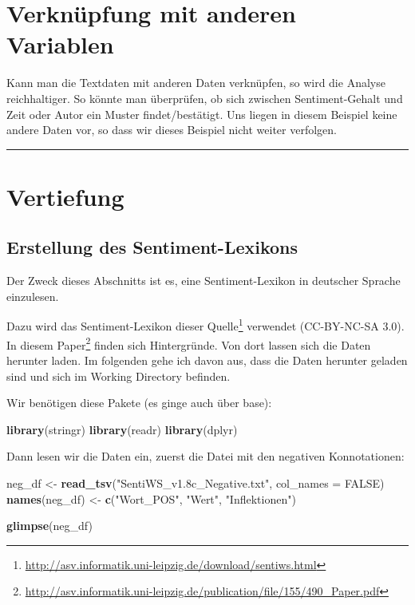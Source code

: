 \documentclass[12pt,]{book}
\makeatletter
\newenvironment{Shaded}{\begin{snugshade}}{\end{snugshade}}
\newcommand{\KeywordTok}[1]{\textcolor[rgb]{0.13,0.29,0.53}{\textbf{{#1}}}}
\newcommand{\DataTypeTok}[1]{\textcolor[rgb]{0.13,0.29,0.53}{{#1}}}
\newcommand{\StringTok}[1]{\textcolor[rgb]{0.31,0.60,0.02}{{#1}}}
\newcommand{\OtherTok}[1]{\textcolor[rgb]{0.56,0.35,0.01}{{#1}}}
\newcommand{\NormalTok}[1]{{#1}}
\renewcommand{\href}[2]{#2\footnote{\url{#1}}}
\newenvironment{kframe}{%
\medskip{}
\setlength{\fboxsep}{.8em}
 \def\at@end@of@kframe{}%
 \ifinner\ifhmode%
  \def\at@end@of@kframe{\end{minipage}}%
  \begin{minipage}{\columnwidth}%
 \fi\fi%
 \def\FrameCommand##1{\hskip\@totalleftmargin \hskip-\fboxsep
 \colorbox{shadecolor}{##1}\hskip-\fboxsep
     \hskip-\linewidth \hskip-\@totalleftmargin \hskip\columnwidth}%
 \MakeFramed {\advance\hsize-\width
   \@totalleftmargin\z@ \linewidth\hsize
   \@setminipage}}%
 {\par\unskip\endMakeFramed%
 \at@end@of@kframe}
\renewenvironment{Shaded}{\begin{kframe}}{\end{kframe}}
\makeatother
\begin{document}
\section{Verknüpfung mit anderen
Variablen}\label{verknupfung-mit-anderen-variablen}

Kann man die Textdaten mit anderen Daten verknüpfen, so wird die Analyse
reichhaltiger. So könnte man überprüfen, ob sich zwischen
Sentiment-Gehalt und Zeit oder Autor ein Muster findet/bestätigt. Uns
liegen in diesem Beispiel keine andere Daten vor, so dass wir dieses
Beispiel nicht weiter verfolgen.

\begin{center}\rule{0.5\linewidth}{\linethickness}\end{center}

\section{Vertiefung}\label{vertiefung}

\subsection{Erstellung des
Sentiment-Lexikons}\label{erstellung-des-sentiment-lexikons}

Der Zweck dieses Abschnitts ist es, eine Sentiment-Lexikon in deutscher
Sprache einzulesen.

Dazu wird das Sentiment-Lexikon
\href{http://asv.informatik.uni-leipzig.de/download/sentiws.html}{dieser
Quelle} verwendet (CC-BY-NC-SA 3.0). In
\href{http://asv.informatik.uni-leipzig.de/publication/file/155/490_Paper.pdf}{diesem
Paper} finden sich Hintergründe. Von dort lassen sich die Daten herunter
laden. Im folgenden gehe ich davon aus, dass die Daten herunter geladen
sind und sich im Working Directory befinden.

Wir benötigen diese Pakete (es ginge auch über base):

\begin{Shaded}
\begin{Highlighting}[]
\KeywordTok{library}\NormalTok{(stringr)}
\KeywordTok{library}\NormalTok{(readr)}
\KeywordTok{library}\NormalTok{(dplyr)}
\end{Highlighting}
\end{Shaded}

Dann lesen wir die Daten ein, zuerst die Datei mit den negativen
Konnotationen:

\begin{Shaded}
\begin{Highlighting}[]
\NormalTok{neg_df <-}\StringTok{ }\KeywordTok{read_tsv}\NormalTok{(}\StringTok{"SentiWS_v1.8c_Negative.txt"}\NormalTok{, }\DataTypeTok{col_names =} \OtherTok{FALSE}\NormalTok{)}
\KeywordTok{names}\NormalTok{(neg_df) <-}\StringTok{ }\KeywordTok{c}\NormalTok{(}\StringTok{"Wort_POS"}\NormalTok{, }\StringTok{"Wert"}\NormalTok{, }\StringTok{"Inflektionen"}\NormalTok{)}

\KeywordTok{glimpse}\NormalTok{(neg_df)}
\end{Highlighting}
\end{Shaded}
\end{document}
